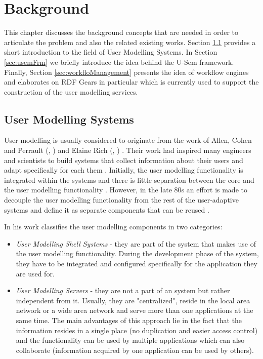 
\chapter{\label{cha:background}Background}
This chapter discusses the background concepts that are needed in order to articulate the problem and also the related existing works. Section \ref{sec:userModellingSystems} provides a short introduction to the field of User Modelling Systems. In Section \ref{sec:usemFrm} we briefly introduce the idea behind the U-Sem framework. Finally, Section \ref{sec:workfloManagement} presents the idea of workflow engines and elaborates on RDF Gears in particular which is currently used to support the construction of the user modelling services.

\section{User Modelling Systems}
\label{sec:userModellingSystems}

User modelling is usually considered to originate from the work of Allen, Cohen and Perrault (\cite{allen1979plan}, \cite{cohen1979elements}) and Elaine Rich (\cite{rich1979building}, \cite{rich1979user}) \cite{kobsa2001generic}. Their work had inspired many engineers and scientists to build systems that collect information about their users and adapt specifically for each them \cite{wahlster1989user}. Initially, the user modelling functionality is integrated within the systems and there is little separation between the core and the user modelling functionality \cite{kobsa2001generic}. However, in the late 80s an effort is made to decouple the user modelling functionality from the rest of the user-adaptive systems and define it as separate components that can be reused \cite{kobsa2001generic}. 

In his work \cite{kobsa2001generic} classifies the user modelling components in two categories:
\begin{itemize}
	\item \textit{User Modelling Shell Systems} - they are part of the system that makes use of the user modelling functionality. During the development phase of the system, they have to be integrated and configured specifically for the application they are used for.
	\item \textit{User Modelling Servers} - they are not a part of an system but rather independent from it. Usually, they are "centralized", reside in the local area network or a wide area network and serve more than one applications at the same time. The main advantages of this approach lie in the fact that the information resides in a single place (no duplication and easier access control) and the functionality can be used by multiple applications which can also collaborate (information acquired by one application can be used by others).
\end{itemize}


